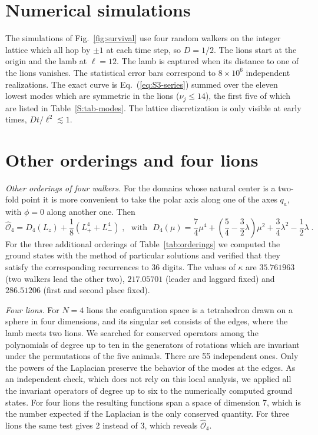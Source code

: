 \section{Numerical simulations} \label{S:sec-simulations}

The simulations of Fig.~\ref{fig:survival} use four random walkers on the integer lattice which all hop by $\pm 1$ at each time step, so $D = 1/2$. The lions start at the origin and the lamb at $\ell = 12$. The lamb is captured when its distance to one of the lions vanishes. The statistical error bars correspond to $8 \times 10^6$ independent realizations. The exact curve is Eq.~(\ref{eq:S3-series}) summed over the eleven lowest modes which are symmetric in the lions ($\nu_j \leq 14$), the first five of which are listed in Table~\ref{S:tab-modes}. The lattice discretization is only visible at early times, $D t/\ell^2 \lesssim 1$.


\section{Other orderings and four lions} \label{S:sec-orderings}

\emph{Other orderings of four walkers.} For the domains whose natural center is a two-fold point it is more convenient to take the polar axis along one of the axes $q_a$, with $\phi = 0$ along another one. Then
\begin{equation} \label{S:frame-4}
    \hat{\mathcal{O}}_4 = D_4(L_z) + \frac{1}{8} \left( L_+^4 + L_-^4 \right) \;, \mbox{~~with~~} D_4(\mu) = \frac{7}{4} \mu^4 + \left( \frac{5}{4} - \frac{3}{2} \lambda \right) \mu^2 + \frac{3}{4} \lambda^2 - \frac{1}{2} \lambda \;.
\end{equation}
For the three additional orderings of Table~\ref{tab:orderings} we computed the ground states with the method of particular solutions and verified that they satisfy the corresponding recurrences to 36 digits. The values of $\kappa$ are $35.761963$ (two walkers lead the other two), $217.05701$ (leader and laggard fixed) and $286.51206$ (first and second place fixed).

\emph{Four lions.} For $N = 4$ lions the configuration space is a tetrahedron drawn on a sphere in four dimensions, and its singular set consists of the edges, where the lamb meets two lions. We searched for conserved operators among the polynomials of degree up to ten in the generators of rotations which are invariant under the permutations of the five animals. There are 55 independent ones. Only the powers of the Laplacian preserve the behavior of the modes at the edges. As an independent check, which does not rely on this local analysis, we applied all the invariant operators of degree up to six to the numerically computed ground states. For four lions the resulting functions span a space of dimension 7, which is the number expected if the Laplacian is the only conserved quantity. For three lions the same test gives 2 instead of 3, which reveals $\hat{\mathcal{O}}_4$.

